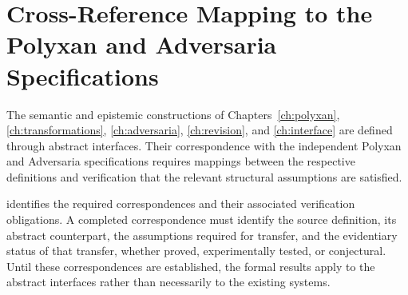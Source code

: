 \documentclass[11pt,twoside,openright]{book}
\theoremstyle{plain}
\theoremstyle{definition}
\theoremstyle{remark}
\begin{document}
\chapter{Cross-Reference Mapping to the Polyxan and Adversaria Specifications}\label{app:crossref}


The semantic and epistemic constructions of
Chapters~\ref{ch:polyxan}, \ref{ch:transformations},
\ref{ch:adversaria}, \ref{ch:revision}, and
\ref{ch:interface} are defined through abstract interfaces.
Their correspondence with the independent Polyxan and
Adversaria specifications requires mappings between the
respective definitions and verification that the relevant
structural assumptions are satisfied.

 identifies the required correspondences
and their associated verification obligations. A completed
correspondence must identify the source definition, its
abstract counterpart, the assumptions required for transfer,
and the evidentiary status of that transfer, whether proved,
experimentally tested, or conjectural. Until these
correspondences are established, the formal results apply
to the abstract interfaces rather than necessarily to
the existing systems.
\end{document}
